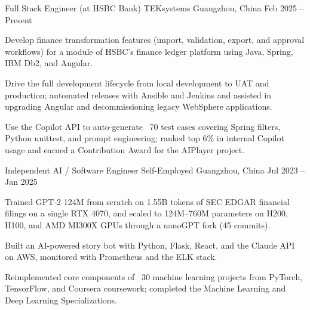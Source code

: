 
\begin{cventries}

  \cventry
    {Full Stack Engineer (at HSBC Bank)} %
    {TEKsystems} %
    {Guangzhou, China} %
    {Feb 2025 -- Present} %
    {
      \begin{cvitems}
        \item {Develop finance transformation features (import, validation, export, and approval workflows) for a module of HSBC's finance ledger platform using Java, Spring, IBM Db2, and Angular.}
        \item {Drive the full development lifecycle from local development to UAT and production; automated releases with Ansible and Jenkins and assisted in upgrading Angular and decommissioning legacy WebSphere applications.}
        \item {Use the Copilot API to auto-generate ~70 test cases covering Spring filters, Python unittest, and prompt engineering; ranked top 6\% in internal Copilot usage and earned a Contribution Award for the AIPlayer project.}
      \end{cvitems}
    }

  \cventry
    {Independent AI / Software Engineer} %
    {Self-Employed} %
    {Guangzhou, China} %
    {Jul 2023 -- Jan 2025} %
    {
      \begin{cvitems}
        \item {Trained GPT-2 124M from scratch on 1.55B tokens of SEC EDGAR financial filings on a single RTX 4070, and scaled to 124M--760M parameters on H200, H100, and AMD MI300X GPUs through a nanoGPT fork (45 commits).}
        \item {Built an AI-powered story bot with Python, Flask, React, and the Claude API on AWS, monitored with Prometheus and the ELK stack.}
        \item {Reimplemented core components of ~30 machine learning projects from PyTorch, TensorFlow, and Coursera coursework; completed the Machine Learning and Deep Learning Specializations.}
      \end{cvitems}
    }


\end{cventries}

